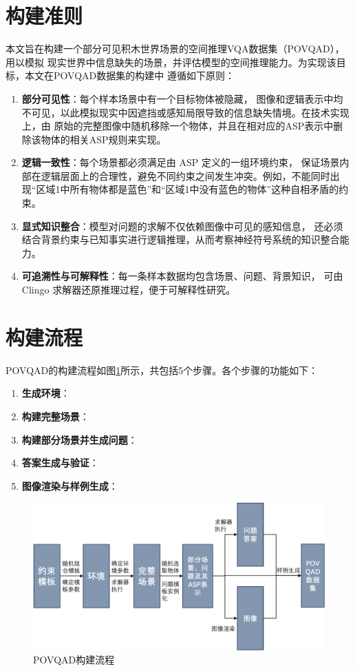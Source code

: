 \section{构建准则}
本文旨在构建一个部分可见积木世界场景的空间推理VQA数据集（POVQAD），用以模拟
现实世界中信息缺失的场景，并评估模型的空间推理能力。为实现该目标，本文在POVQAD数据集的构建中
遵循如下原则：
\begin{enumerate}[nosep]
\item \textbf{部分可见性}：每个样本场景中有一个目标物体被隐藏，
图像和逻辑表示中均不可见，以此模拟现实中因遮挡或感知局限导致的信息缺失情境。在技术实现上，由
原始的完整图像中随机移除一个物体，并且在相对应的ASP表示中删除该物体的相关ASP规则来实现。
\item \textbf{逻辑一致性}：每个场景都必须满足由 ASP 定义的一组环境约束，
保证场景内部在逻辑层面上的合理性，避免不同约束之间发生冲突。例如，不能同时出现“区域1中所有物体都是蓝色”和“区域1中没有蓝色的物体”这种自相矛盾的约束。
\item \textbf{显式知识整合}：模型对问题的求解不仅依赖图像中可见的感知信息，
还必须结合背景约束与已知事实进行逻辑推理，从而考察神经符号系统的知识整合能力。
\item \textbf{可追溯性与可解释性}：每一条样本数据均包含场景、问题、背景知识，
可由 Clingo 求解器还原推理过程，便于可解释性研究。
\end{enumerate}
\section{构建流程}
POVQAD的构建流程如图\ref{fig:dataset-generation}所示，共包括5个步骤。各个步骤的功能如下：
\begin{enumerate}[nosep]
\item \textbf{生成环境}：
\item \textbf{构建完整场景}：
\item \textbf{构建部分场景并生成问题}：
\item \textbf{答案生成与验证}：
\item \textbf{图像渲染与样例生成}：
\end{enumerate}
\begin{figure}
\centering
\includegraphics[scale=0.6]{figures/dataset-generation-pipeline-crop.pdf}
\caption{POVQAD构建流程}
\label{fig:dataset-generation}
\end{figure}

